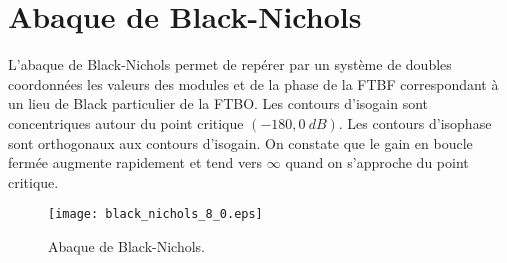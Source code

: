 \section{Abaque de Black-Nichols}
L'abaque de Black-Nichols permet de repérer par un système de doubles 
coordonnées les valeurs des modules et de la phase de la FTBF correspondant à 
un lieu de Black particulier de la FTBO. Les contours d'isogain sont 
concentriques autour du point critique $(-180,\SI{0}{dB})$. Les contours 
d'isophase sont orthogonaux aux contours d'isogain.
On constate que le gain en boucle fermée augmente rapidement et tend vers 
$\infty$ quand on s'approche du point critique.
\begin{figure}[!h]
    \centering
    \texttt{[image: black\_nichols\_8\_0.eps]}
    \caption{Abaque de Black-Nichols.}
\end{figure}
\clearpage
